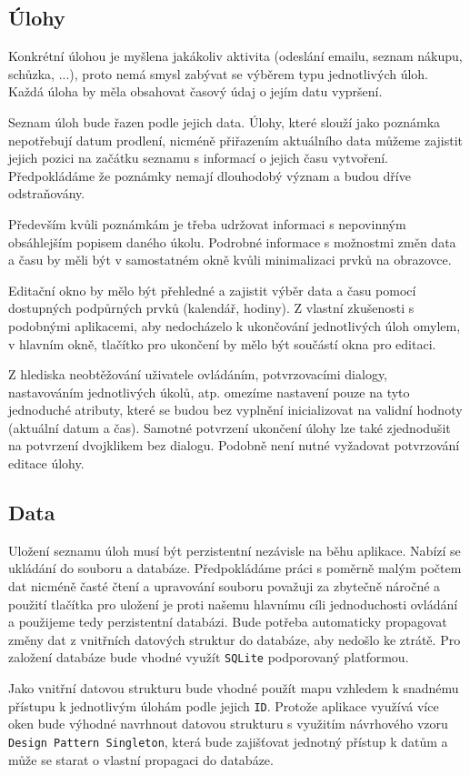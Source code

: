 \documentclass[12pt]{article}
\begin{document}
\subsection{Úlohy}
Konkrétní úlohou je myšlena jakákoliv aktivita (odeslání emailu, seznam nákupu, schůzka, ...), proto nemá smysl zabývat se výběrem typu jednotlivých úloh. Každá úloha by měla obsahovat časový údaj o jejím datu vypršení. 

Seznam úloh bude řazen podle jejich data. Úlohy, které slouží jako poznámka nepotřebují datum prodlení, nicméně přiřazením aktuálního data můžeme zajistit jejich pozici na začátku seznamu s informací o jejich času vytvoření. Předpokládáme že poznámky nemají dlouhodobý význam a budou dříve odstraňovány.

Především kvůli poznámkám je třeba udržovat informaci s nepovinným obsáhlejším popisem daného úkolu. Podrobné informace s možnostmi změn data a času by měli být v samostatném okně kvůli minimalizaci prvků na obrazovce. 

Editační okno by mělo být přehledné a zajistit výběr data a času pomocí dostupných podpůrných prvků (kalendář, hodiny). Z vlastní zkušenosti s podobnými aplikacemi, aby nedocházelo k ukončování jednotlivých úloh omylem, v hlavním okně, tlačítko pro ukončení by mělo být součástí okna pro editaci. 

Z hlediska neobtěžování uživatele ovládáním, potvrzovacími dialogy, nastavováním jednotlivých úkolů, atp. omezíme nastavení pouze na tyto jednoduché atributy, které se budou bez vyplnění inicializovat na validní hodnoty (aktuální datum a čas). Samotné potvrzení ukončení úlohy lze také zjednodušit na potvrzení dvojklikem bez dialogu. Podobně není nutné vyžadovat potvrzování editace úlohy.

\subsection{Data}
Uložení seznamu úloh musí být perzistentní nezávisle na běhu aplikace. Nabízí se ukládání do souboru a databáze. Předpokládáme práci s poměrně malým počtem dat nicméně časté čtení a upravování souboru považuji za zbytečně náročné a použití tlačítka pro uložení je proti našemu hlavnímu cíli jednoduchosti ovládání a použijeme tedy perzistentní databázi. Bude potřeba automaticky propagovat změny dat z vnitřních datových struktur do databáze, aby nedošlo ke ztrátě. Pro založení databáze bude vhodné využít \texttt{SQLite} podporovaný platformou. 

Jako vnitřní datovou strukturu bude vhodné použít mapu vzhledem k snadnému přístupu k jednotlivým úlohám podle jejich \texttt{ID}. Protože aplikace využívá více oken bude výhodné navrhnout datovou strukturu s využitím návrhového vzoru \texttt{Design Pattern Singleton}, která bude zajišťovat jednotný přístup k datům a může se starat o vlastní propagaci do databáze.
\end{document}
